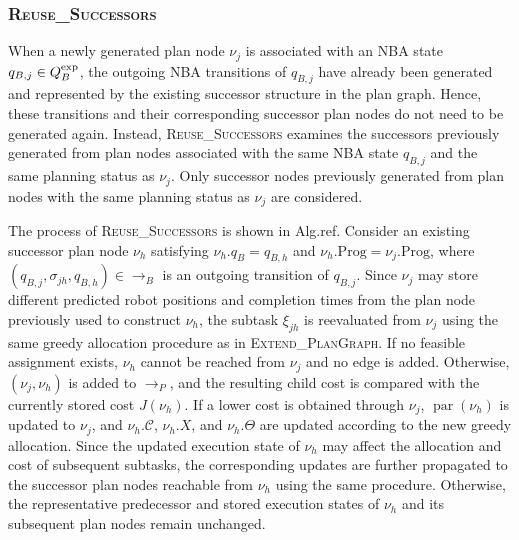 \documentclass[lettersize,journal]{IEEEtran}
\theoremstyle{italiclemma}
\theoremstyle{italiclemma}
\theoremstyle{definition}
\begin{document}
\subsubsection{\textsc{Reuse\_Successors}}

When a newly generated plan node $\nu_j$ is associated with an NBA state $q_{B,j}\in Q_B^{\rm exp}$, the outgoing NBA transitions of $q_{B,j}$ have already been generated and represented by the existing successor structure in the plan graph. Hence, these transitions and their corresponding successor plan nodes do not need to be generated again. Instead, \textsc{Reuse\_Successors} examines the successors previously generated from plan nodes associated with the same NBA state $q_{B,j}$ and the same planning status as $\nu_j$. Only successor nodes previously generated from plan nodes with the same
planning status as $\nu_j$ are considered.

The process of \textsc{Reuse\_Successors} is shown in Alg.ref{\label{alg:reuse_successors}}.
Consider an existing successor plan node $\nu_h$ satisfying
$\nu_h.q_B=q_{B,h}$ and $\nu_h.\mathrm{Prog}=\nu_j.\mathrm{Prog}$, where $(q_{B,j},\sigma_{jh},q_{B,h})\in\rightarrow_B$ is an outgoing transition of $q_{B,j}$.
Since $\nu_j$ may store different predicted robot positions and completion times from the plan node
previously used to construct $\nu_h$, the subtask $\xi_{jh}$ is reevaluated from $\nu_j$ using the same greedy allocation procedure as in \textsc{Extend\_PlanGraph}. If no feasible assignment exists, $\nu_h$ cannot be reached from $\nu_j$ and no edge is added. Otherwise, $(\nu_j,\nu_h)$ is added to $\rightarrow_P$, and the resulting child cost is compared with the currently stored cost $J(\nu_h)$. If a lower cost is obtained through $\nu_j$, $\operatorname{par}(\nu_h)$ is updated to $\nu_j$, and
$\nu_h.\mathcal C$, $\nu_h.X$, and $\nu_h.\Theta$ are updated according to the new greedy allocation. Since the updated execution state of $\nu_h$ may affect the allocation and cost of subsequent subtasks, the corresponding updates are further propagated to the
successor plan nodes reachable from $\nu_h$ using the same procedure. Otherwise, the representative predecessor and stored execution states of $\nu_h$ and its subsequent plan nodes remain unchanged.
\end{document}
